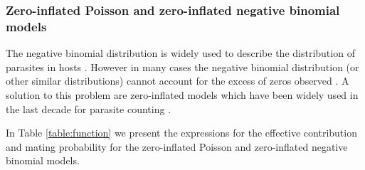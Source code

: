 \documentclass[12pt,a4paper]{article}
\theoremstyle{plain}%
\theoremstyle{definition}
\theoremstyle{remark}
\begin{document}
	\subsubsection{Zero-inflated Poisson and zero-inflated negative binomial models}
	The negative binomial distribution is widely used to describe the distribution of parasites in hosts \cite{crofton1971quantitative,seo1979frequency}.
	However in many cases the negative binomial distribution (or other similar distributions) cannot account for the excess of zeros observed \cite{crofton1971quantitative}. A solution to this problem are  zero-inflated models which have been widely used in the last decade for parasite counting \citep{abdybekova2012frequency,denwood2008distribution,ziadinov2010frequency}. 
	
	In Table \ref{table:function}  we present the expressions for the effective contribution  and mating probability for the zero-inflated Poisson and zero-inflated negative binomial models.
	
	
	
\end{document}
